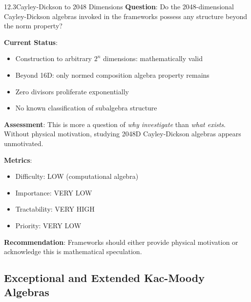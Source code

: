 \begin{openproblem}{12.3}{Cayley-Dickson to 2048 Dimensions}
\textbf{Question}: Do the 2048-dimensional Cayley-Dickson algebras invoked in the frameworks possess any structure beyond the norm property?

\textbf{Current Status}:
\begin{itemize}
    \item Construction to arbitrary $2^n$ dimensions: mathematically valid
    \item Beyond 16D: only normed composition algebra property remains
    \item Zero divisors proliferate exponentially
    \item No known classification of subalgebra structure
\end{itemize}

\textbf{Assessment}: This is more a question of \textit{why investigate} than \textit{what exists}. Without physical motivation, studying 2048D Cayley-Dickson algebras appears unmotivated.

\textbf{Metrics}:
\begin{itemize}
    \item Difficulty: LOW (computational algebra)
    \item Importance: VERY LOW
    \item Tractability: VERY HIGH
    \item Priority: VERY LOW
\end{itemize}

\textbf{Recommendation}: Frameworks should either provide physical motivation or acknowledge this is mathematical speculation.
\end{openproblem}

\subsection{Exceptional and Extended Kac-Moody Algebras}

